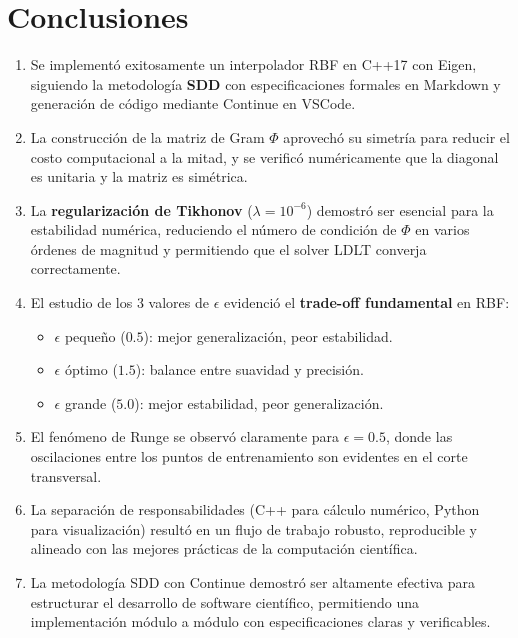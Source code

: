 \documentclass[12pt,a4paper]{article}
\theoremstyle{definition}
\begin{document}
\section{Conclusiones}\label{sec:conclusiones}

\begin{enumerate}
    \item Se implement\'{o} exitosamente un interpolador RBF en C++17 con Eigen, siguiendo la metodolog\'{i}a \textbf{SDD} con especificaciones formales en Markdown y generaci\'{o}n de c\'{o}digo mediante Continue en VSCode.
    
    \item La construcci\'{o}n de la matriz de Gram $\Phi$ aprovech\'{o} su simetr\'{i}a para reducir el costo computacional a la mitad, y se verific\'{o} num\'{e}ricamente que la diagonal es unitaria y la matriz es sim\'{e}trica.
    
    \item La \textbf{regularizaci\'{o}n de Tikhonov} ($\lambda = 10^{-6}$) demostr\'{o} ser esencial para la estabilidad num\'{e}rica, reduciendo el n\'{u}mero de condici\'{o}n de $\Phi$ en varios \'{o}rdenes de magnitud y permitiendo que el solver LDLT converja correctamente.
    
    \item El estudio de los 3 valores de $\epsilon$ evidenci\'{o} el \textbf{trade-off fundamental} en RBF:
    \begin{itemize}
        \item $\epsilon$ peque\~{n}o ($0.5$): mejor generalizaci\'{o}n, peor estabilidad.
        \item $\epsilon$ \'optimo ($1.5$): balance entre suavidad y precisi\'{o}n.
        \item $\epsilon$ grande ($5.0$): mejor estabilidad, peor generalizaci\'{o}n.
    \end{itemize}
    
    \item El fen\'{o}meno de Runge se observ\'{o} claramente para $\epsilon = 0.5$, donde las oscilaciones entre los puntos de entrenamiento son evidentes en el corte transversal.
    
    \item La separaci\'{o}n de responsabilidades (C++ para c\'{a}lculo num\'{e}rico, Python para visualizaci\'{o}n) result\'{o} en un flujo de trabajo robusto, reproducible y alineado con las mejores pr\'{a}cticas de la computaci\'{o}n cient\'{i}fica.
    
    \item La metodolog\'{i}a SDD con Continue demostr\'{o} ser altamente efectiva para estructurar el desarrollo de software cient\'{i}fico, permitiendo una implementaci\'{o}n m\'{o}dulo a m\'{o}dulo con especificaciones claras y verificables.
\end{enumerate}
\end{document}
